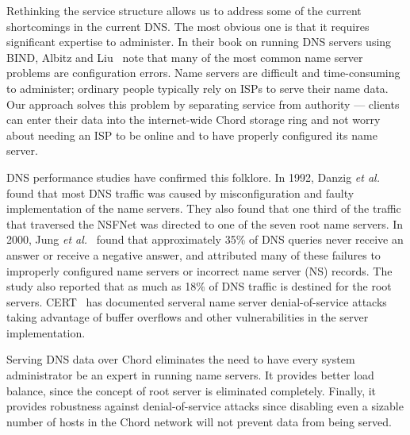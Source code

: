 Rethinking the service structure allows us to address
some of the current shortcomings in the current DNS.
The most obvious one is that it requires 
significant expertise to administer.
In their book on running DNS servers using BIND,
Albitz and Liu~\cite{dns-bind} note that many of the most
common name server problems are configuration errors.
Name servers are difficult and time-consuming to administer;
ordinary people typically rely on ISPs to serve their name data.
Our approach solves this problem by separating service from
authority --- clients can enter their data into the internet-wide
Chord storage ring and not worry about needing an ISP to be
online and to have properly configured its name server.

DNS performance studies have confirmed this folklore.
In 1992, Danzig {\it et al.}~\cite{dnsroot:sigcomm92} found that
most DNS traffic was caused by misconfiguration and faulty implementation
of the name servers.
They also found that one third of the 
traffic that traversed the NSFNet was directed to one of 
the seven root name servers. 
In 2000, Jung {\it et al.}~\cite{dnscache:sigcommimw01}
found that approximately 35\% of DNS queries never receive
an answer or receive a negative answer, and attributed
many of these failures to 
improperly configured name servers or incorrect name server (NS) records.
The study also reported that as much as 18\% of DNS traffic is destined
for the root servers. 
CERT~\cite{cert} has documented serveral name server
denial-of-service attacks taking advantage of buffer overflows
and other vulnerabilities in the server implementation.

Serving DNS data over Chord eliminates the need to have
every system administrator be an expert in running name servers.
It provides better load balance, since the concept of root server
is eliminated completely.
Finally, it provides robustness against denial-of-service attacks
since disabling even a sizable number of hosts in the 
Chord network will not prevent data from being served.
